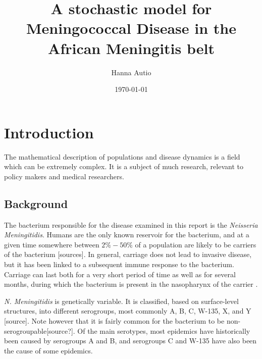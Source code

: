 \documentclass[10pt,a4paper]{article}
\author{Hanna Autio}
\title{A stochastic model for Meningococcal Disease in the African Meningitis belt} %
\date{\today}
\begin{document}
\maketitle
\thispagestyle{empty}
\cleardoublepage
\newpage
\setcounter{page}{1}



\section{Introduction}

The mathematical description of populations and disease dynamics is a field which can be extremely complex. It is a subject of much research, relevant to policy makers and medical researchers.






\subsection{Background}

The bacterium responsible for the disease examined in this report is the \emph{Neisseria Meningitidis}. Humans are the only known reservoir for the bacterium, and at a given time somewhere between $2\% - 50\%$ of a population are likely to be carriers of the bacterium [sources]. In general, carriage does not lead to invasive disease, but it has been linked to a subsequent immune response to the bacterium. Carriage can last both for a very short period of time as well as for several months, during which the bacterium is present in the nasopharynx of the carrier \cite{taha2002duality}. 

\emph{N. Meningitidis} is genetically variable. It is classified, based on surface-level structures, into different serogroups, most commonly A, B, C, W-135, X, and Y [source]. Note however that it is fairly common for the bacterium to be non-serogroupable[source?]. Of the main serotypes, most epidemics have historically been caused by serogroups A and B, and serogroups C and W-135 have also been the cause of some epidemics. 
\end{document}
